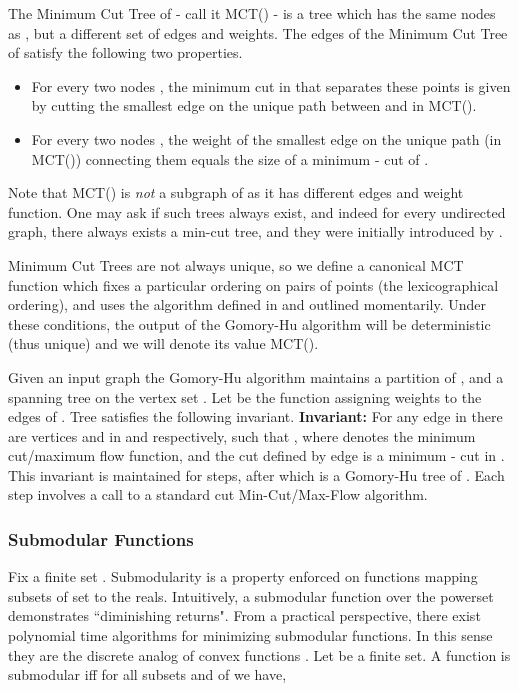 \documentclass[twoside,11pt]{article}
\begin{document}
The Minimum Cut Tree of  - call it MCT() - is a tree which has the same nodes as , but a different set of edges and weights. The edges of the Minimum Cut
Tree of  satisfy the following two properties.

\begin{itemize}
	\item For every two nodes , the minimum cut in  that separates these points is given by cutting the smallest edge on the unique path between  and  in MCT().
	\item For every two nodes , the weight of the smallest edge on the unique path (in MCT()) connecting them equals the size of a minimum - cut of .
\end{itemize}

Note that MCT() is \textit{not} a subgraph of  as it has different edges and weight function. One may ask if such trees always exist, and indeed for every undirected graph, there always exists a min-cut tree, and they were initially introduced by \cite{gomoryhu}.

Minimum Cut Trees are not always unique, so we define a canonical MCT function which fixes a particular
ordering on pairs of points (the lexicographical ordering), and uses the algorithm defined in \citep{gomoryhu} and outlined momentarily. Under these conditions, the output of the Gomory-Hu algorithm will be deterministic (thus unique) and we will denote its value MCT().

Given an input graph  the Gomory-Hu algorithm maintains a partition of ,  and a spanning tree  on the vertex set
. Let  be the function assigning weights to the edges of . Tree  satisfies the following invariant. \textbf{Invariant:} For any edge  in  there are vertices  and  in  and  respectively, such that , where  denotes the minimum cut/maximum flow function, and the cut defined by edge  is a minimum - cut in . This invariant is maintained for  steps, after which  is a Gomory-Hu tree of  \citep{vaziranibook}. Each step involves a call to a standard  cut Min-Cut/Max-Flow algorithm.

\subsubsection{Submodular Functions}
Fix a finite set . Submodularity is a property enforced on functions mapping subsets of  set to the reals.  Intuitively, a submodular function over the powerset demonstrates ``diminishing returns".  From a practical perspective, there exist polynomial time algorithms for minimizing submodular functions. In this sense they are the discrete analog of convex functions \citep{awesomesub}.
Let  be a finite set.  A function  is submodular iff for all subsets  and  of  we have,
\end{document}
